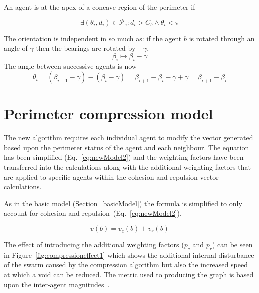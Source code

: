 \documentclass[12pt,a4paper]{IEEEtran}
\begin{document}
An agent is at the apex of a concave region of the perimeter if

\begin{equation}
\exists(\theta_i,d_i)\in\mathcal{P}_e : d_i>C_b\wedge\theta_i<\pi
\label{concave-predicate}
\end{equation}

The orientation is independent in so much as: if the agent $b$ is rotated through an angle of $\gamma$ then the bearings are rotated by $-\gamma$, \[ \beta_i\mapsto\beta_i-\gamma \] The  angle between successive agents is now
\footnotesize
\[
\theta_i  =  (\beta_{i+1}-\gamma) - (\beta_i-\gamma)
= \beta_{i+1}-\beta_i-\gamma+\gamma
= \beta_{i+1}-\beta_i
\]
\normalsize

\section{Perimeter compression model}
The new algorithm requires each individual agent to modify the vector generated based upon the perimeter status of the agent and each neighbour. The equation has been simplified (Eq.~\ref{eq:newModel2}) and the weighting factors have been transferred into the calculations along with the additional weighting factors that are applied to specific agents within the cohesion and repulsion vector calculations.


As in the basic model (Section~\ref{basicModel}) the formula is simplified to only account for cohesion and repulsion~(Eq.~\ref{eq:newModel2}).

\begin{equation}\label{eq:newModel2}
v(b) = v_c(b) + v_r(b)
\end{equation}

The effect of introducing the additional weighting factors ($p_c$ and $p_r$) can be seen in Figure~\ref{fig:compressioneffect1} which shows the additional internal disturbance of the swarm caused by the compression algorithm but also the increased speed at which a void can be reduced. The metric used to producing the graph is based upon the inter-agent magnitudes~\cite{eliot2018metric}. 
\end{document}
